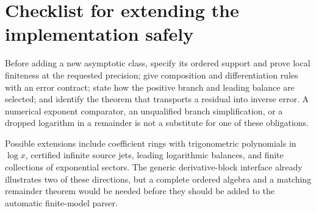 \documentclass[11pt,a4paper]{article}
\numberwithin{equation}{section}
\theoremstyle{definition}\newtheorem{definition}[theorem]{Definition}
\theoremstyle{remark}\newtheorem{remark}[theorem]{Remark}
\begin{document}
\section{Checklist for extending the implementation safely}
Before adding a new asymptotic class, specify its ordered support and prove local finiteness at the requested precision; give composition and differentiation rules with an error contract; state how the positive branch and leading balance are selected; and identify the theorem that transports a residual into inverse error. A numerical exponent comparator, an unqualified branch simplification, or a dropped logarithm in a remainder is not a substitute for one of these obligations.

Possible extensions include coefficient rings with trigonometric polynomials in $\log x$, certified infinite source jets, leading logarithmic balances, and finite collections of exponential sectors. The generic derivative-block interface already illustrates two of these directions, but a complete ordered algebra and a matching remainder theorem would be needed before they should be added to the automatic finite-model parser.
\end{document}

